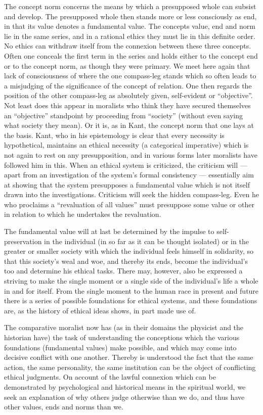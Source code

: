 \documentclass[12pt]{article}
\newcommand{\opage}[1]{\marginnote{\footnotesize\textit{[#1]}}}
\begin{document}
The concept norm concerns the means by which a presupposed whole can subsist
and develop. The presupposed whole then stands more or less consciously as
end, in that its value denotes a fundamental value. The concepts value, end
and norm lie in the same series, and in a rational ethics they must lie in
this definite order. No ethics can withdraw itself from the connexion
between these three concepts. Often one conceals the first term in the
series and holds either to the concept end or to the concept norm, as though
they were primary. We meet here again that lack of consciousness of where
the one compass-leg stands which so often leads to a misjudging of the
significance of the concept of relation. One then regards the position of
the other compass-leg as absolutely given, self-evident or ``objective''.
Not least does \opage{84}this appear in moralists who think they have secured
themselves an ``objective'' standpoint by proceeding from ``society''
(without even saying what society they mean). Or it is, as in Kant, the
concept norm that one lays at the basis. Kant, who in his epistemology is
clear that every necessity is hypothetical, maintains an ethical necessity
(a categorical imperative) which is not again to rest on any presupposition,
and in various forms later moralists have followed him in this. When an
ethical system is criticized, the criticism will --- apart from an
investigation of the system's formal consistency --- essentially aim at
showing that the system presupposes a fundamental value which is not itself
drawn into the investigations. Criticism will seek the hidden compass-leg.
Even he who proclaims a ``revaluation of all values'' must presuppose some
value or other in relation to which he undertakes the revaluation.

The fundamental value will at last be determined by the impulse to
self-preservation in the individual (in so far as it can be thought
isolated) or in the greater or smaller society with which the individual
feels himself in solidarity, so that this society's weal and woe, and
thereby its ends, become the individual's too and determine his ethical
tasks. There may, however, also be expressed a striving to make the single
moment or a single side of the individual's life a whole in and for itself.
From the single moment to the human race in present and future there is a
series of possible foundations for ethical systems, and these foundations
are, as the history of ethical ideas shows, in part made use of.

The comparative moralist now has (as in their domains the physicist and the
historian have) the task of understanding the conceptions which the various
foundations (fundamental values) make possible, and which may come into
decisive conflict \opage{85}with one another. Thereby is understood the fact that the
same action, the same personality, the same institution can be the object of
conflicting ethical judgments. On account of the lawful connexion which can
be demonstrated by psychological and historical means in the spiritual
world, we seek an explanation of why others judge otherwise than we do, and
thus have other values, ends and norms than we.
\end{document}
